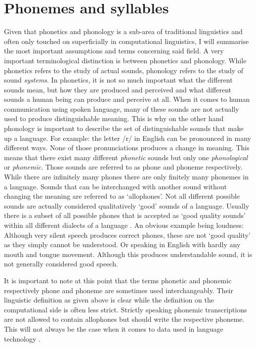\section{Phonemes and syllables}
\label{phonology}
Given that phonetics and phonology is a sub-area of traditional linguistics and often only touched on superficially in computational linguistics, I will summarise the most important assumptions and terms concerning said field. A very important terminological distinction is between phonetics and phonology. While phonetics refers to the study of actual sounds, phonology refers to the study of sound \textit{systems}. In phonetics, it is not so much important what the different sounds mean, but how they are produced and perceived and what different sounds a human being can produce and perceive at all. When it comes to human communication using spoken language, many of these sounds are not actually used to produce distinguishable meaning. This is why on the other hand phonology is important to describe the set of distinguishable sounds that make up a language. For example: the letter /r/ in English can be pronounced in many different ways. None of those pronunciations produces a change in meaning. This means that there exist many different \textit{phonetic} sounds but only one \textit{phonological} or \textit{phonemic}. Those sounds are referred to as phone and phoneme respectively. While there are infinitely many phones there are only finitely many phonemes in a language. Sounds that can be interchanged with another sound without changing the meaning are referred to as `allophones'. Not all different possible sounds are actually considered qualitatively `good' sounds of a language. Usually there is a subset of all possible phones that is accepted as `good quality sounds' within all different dialects of a language \citep{Intro.2007}. An obvious example being loudness: Although very silent speech produces correct phones, these are not `good quality' as they simply cannot be understood. Or speaking in English with hardly any mouth and tongue movement. Although this produces understandable sound, it is not generally considered good speech. 

It is important to note at this point that the terms phonetic and phonemic respectively phone and phoneme are sometimes used interchangeably. Their linguistic definition as given above is clear while the definition on the computational side is often less strict. Strictly speaking phonemic transcriptions are not allowed to contain allophones but should write the respective phoneme. This will not always be the case when it comes to data used in language technology \citep{Lee&Ashby.2020}. 


